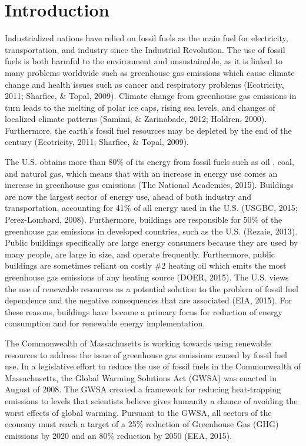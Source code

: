 
\chapter{Introduction}
\par Industrialized nations have relied on fossil fuels as the main fuel for electricity, transportation, and industry since the Industrial Revolution. The use of fossil fuels is both harmful to the environment and unsustainable, as it is linked to many problems worldwide such as greenhouse gas emissions which cause climate change and health issues such as cancer and respiratory problems (Ecotricity, 2011; Sharfiee, \& Topal, 2009). Climate change from greenhouse gas emissions in turn leads to the melting of polar ice caps, rising sea levels, and changes of localized climate patterns (Samimi, \& Zarinabade, 2012; Holdren, 2000). Furthermore, the earth's fossil fuel resources may be depleted by the end of the century (Ecotricity, 2011; Sharfiee, \& Topal, 2009).
\par The U.S. obtains more than 80\% of its energy from fossil fuels such as oil , coal, and natural gas, which means that with an increase in energy use comes an increase in greenhouse gas emissions (The National Academies, 2015). Buildings are now the largest sector of energy use, ahead of both industry and transportation, accounting for 41\% of all energy used in the U.S. (USGBC, 2015; Perez-Lombard, 2008). Furthermore, buildings are responsible for 50\% of the greenhouse gas emissions in developed countries, such as the U.S. (Rezaie, 2013). Public buildings specifically are large energy consumers because they are used by many people, are large in size, and operate frequently. Furthermore, public buildings are sometimes reliant on costly \#2 heating oil which emits the most greenhouse gas emissions of any heating source (DOER, 2015). The U.S. views the use of renewable resources as a potential solution to the problem of fossil fuel dependence and the negative consequences that are associated (EIA, 2015). For these reasons, buildings have become a primary focus for reduction of energy consumption and for renewable energy implementation.
\par The Commonwealth of Massachusetts is working towards using renewable resources to address the issue of greenhouse gas emissions caused by fossil fuel use. In a legislative effort to reduce the use of fossil fuels in the Commonwealth of Massachusetts, the Global Warming Solutions Act (GWSA) was enacted in August of 2008. The GWSA created a framework for reducing heat-trapping emissions to levels that scientists believe gives humanity a chance of avoiding the worst effects of global warming. Pursuant to the GWSA, all sectors of the economy must reach a target of a 25\% reduction of Greenhouse Gas (GHG) emissions by 2020 and an 80\% reduction by 2050  (EEA, 2015).

